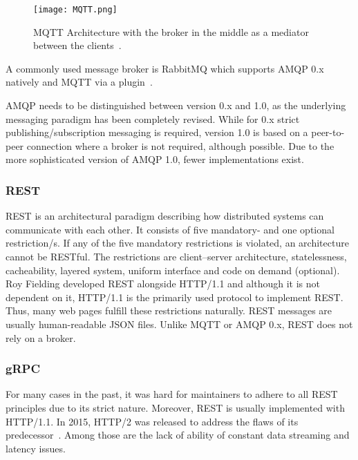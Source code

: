 \begin{figure}[ht]
	\centering
  \texttt{[image: MQTT.png]}
	\caption[MQTT Architecture]{MQTT Architecture with the broker in the middle as a mediator between the clients~\cite{1Sheeld2018Pure-javascript-MQTT-broker.2018}.}
	\label{MQTT}
\end{figure}

A commonly used message broker is RabbitMQ which supports AMQP 0.x natively and MQTT via a plugin~\cite{RabittMQ-Documentation2018Which2018}.

AMQP needs to be distinguished between version 0.x and 1.0, as the underlying messaging paradigm has been completely revised. While for 0.x strict publishing/subscription messaging is required, version 1.0 is based on a peer-to-peer connection where a broker is not required, although possible. Due to the more sophisticated version of AMQP 1.0, fewer implementations exist.~\cite{Dizdarevic2019AIntegration}

\subsubsection{REST}
REST is an architectural paradigm describing how distributed systems can communicate with each other. It consists of five mandatory- and one optional restriction/s. If any of the five mandatory restrictions is violated, an architecture cannot be RESTful. The restrictions are client–server architecture, statelessness, cacheability, layered system, uniform interface and code on demand (optional). Roy Fielding developed REST alongside HTTP/1.1 and although it is not dependent on it, HTTP/1.1 is the primarily used protocol to implement REST. Thus, many web pages fulfill these restrictions naturally. REST messages are usually human-readable JSON files. Unlike MQTT or AMQP 0.x, REST does not rely on a broker.~\cite{Fielding2000ArchitecturalArchitectures}

\subsubsection{gRPC}
\label{sec:grpc}
For many cases in the past, it was hard for maintainers to adhere to all REST principles due to its strict nature. Moreover, REST is usually implemented with HTTP/1.1. In 2015, HTTP/2 was released to address the flaws of its predecessor~\cite{Sayfan2018REST2018}. Among those are the lack of ability of constant data streaming and latency issues.

